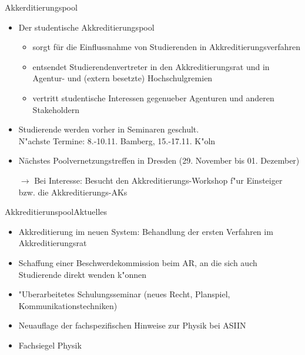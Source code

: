 \documentclass[compress, aspectratio=169]{beamer}
\begin{document}
\begin{frame}{Akkerditierungspool}
    \begin{itemize}
        \item Der studentische Akkreditierungspool
        \begin{itemize}
        	\item sorgt für die Einflussnahme von Studierenden in Akkreditierungsverfahren
        	\item entsendet Studierendenvertreter in den Akkreditierungsrat und in Agentur- und (extern besetzte) Hochschulgremien
        	\item vertritt studentische Interessen gegenueber Agenturen und anderen Stakeholdern
\end{itemize}         
        \item Studierende werden vorher in Seminaren geschult. \\
        {\scriptsize\color{blue} N"achste Termine: 8.-10.11. Bamberg, 15.-17.11. K"oln}
        \item Nächstes Poolvernetzungstreffen in Dresden {\color{blue} (29. November bis 01. Dezember)}
        \vspace{0.5cm}
        \item[$\rightarrow$] Bei Interesse: Besucht den Akkreditierungs-Workshop f"ur Einsteiger bzw. die Akkreditierungs-AKs
    \end{itemize}
\end{frame}

\begin{frame}{Akkreditierunspool}{Aktuelles}
	\begin{itemize}
		\item Akkreditierung im neuen System: Behandlung der ersten Verfahren im Akkreditierungsrat
		\item Schaffung einer Beschwerdekommission beim AR, an die sich auch Studierende direkt wenden k"onnen
		\item "Uberarbeitetes Schulungsseminar (neues Recht, Planspiel, Kommunikationstechniken)
		\item Neuauflage der fachspezifischen Hinweise zur Physik bei ASIIN
		\item Fachsiegel Physik
	\end{itemize}
\end{frame}
\end{document}

